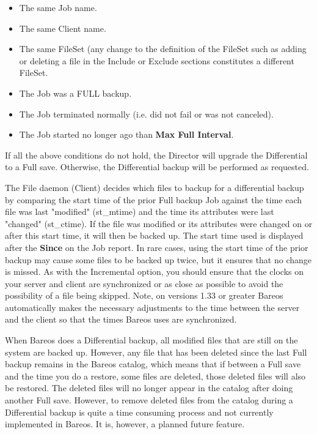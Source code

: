 {\begin{description}
\begin{description}
\begin{itemize}
\item The same Job name.
\item The same Client name.
\item The same FileSet (any change to the definition of  the FileSet such as
adding or deleting a file in the  Include or Exclude sections constitutes a
different FileSet.
\item The Job was a FULL backup.
\item The Job terminated normally (i.e. did not fail or was not  canceled).
\item The Job started no longer ago than {\bf Max Full Interval}.
\end{itemize}

If all the above conditions do not hold, the Director will  upgrade the
Differential to a Full save. Otherwise, the  Differential backup will be
performed as requested.

The File daemon (Client) decides which files to backup for a
differential backup by comparing the start time of the prior Full backup
Job against the time each file was last "modified" (st\_mtime) and the
time its attributes were last "changed" (st\_ctime).  If the file was
modified or its attributes were changed on or after this start time, it
will then be backed up.  The start time used is displayed after the {\bf
Since} on the Job report.  In rare cases, using the start time of the
prior backup may cause some files to be backed up twice, but it ensures
that no change is missed.  As with the Incremental option, you should
ensure that the clocks on your server and client are synchronized or as
close as possible to avoid the possibility of a file being skipped.
Note, on versions 1.33 or greater Bareos automatically makes the
necessary adjustments to the time between the server and the client so
that the times Bareos uses are synchronized.

When Bareos does a Differential backup, all modified files that are
still on the system are backed up.  However, any file that has been
deleted since the last Full backup remains in the Bareos catalog, which
means that if between a Full save and the time you do a restore, some
files are deleted, those deleted files will also be restored.  The
deleted files will no longer appear in the catalog after doing another
Full save.  However, to remove deleted files from the catalog during a
Differential backup is quite a time consuming process and not currently
implemented in Bareos.  It is, however, a planned future feature.


\end{description}
\end{description}}
